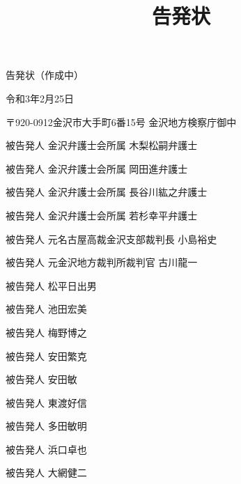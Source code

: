 \documentclass[
]{ltjarticle}
\title{告発状}
\author{}
\date{}
\begin{document}
\vspace{25mm}
\fontsize{16pt}{0cm}\selectfont
\begin{center}
告発状（作成中）
\par\end{center}
\vspace{10mm}
\fontsize{11pt}{11pt}\selectfont
\vspace{3mm}
\begin{flushright}
令和3年2月25日
\par\end{flushright}
〒920-0912金沢市大手町6番15号 金沢地方検察庁御中

\fontsize{10pt}{10pt}\selectfont
\vspace{3mm}
\hspace{90mm}被告発人 金沢弁護士会所属 木梨松嗣弁護士

\hspace{90mm}被告発人 金沢弁護士会所属 岡田進弁護士

\hspace{90mm}被告発人 金沢弁護士会所属 長谷川紘之弁護士 

\hspace{90mm}被告発人 金沢弁護士会所属 若杉幸平弁護士

\hspace{90mm}被告発人 元名古屋高裁金沢支部裁判長 小島裕史 

\hspace{90mm}被告発人 元金沢地方裁判所裁判官 古川龍一

\hspace{90mm}被告発人 松平日出男

\hspace{90mm}被告発人 池田宏美 

\hspace{90mm}被告発人 梅野博之

\hspace{90mm}被告発人 安田繁克 

\hspace{90mm}被告発人 安田敏 

\hspace{90mm}被告発人 東渡好信 

\hspace{90mm}被告発人 多田敏明 

\hspace{90mm}被告発人 浜口卓也 

\hspace{90mm}被告発人 大網健二

\hspace{90mm}
\end{document}
